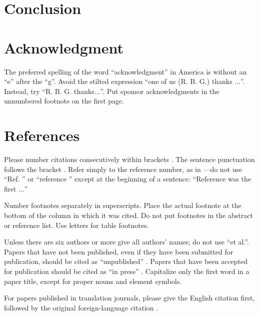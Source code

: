 \documentclass[conference]{IEEEtran}
\begin{document}
\section{Conclusion}

\section*{Acknowledgment}

The preferred spelling of the word ``acknowledgment'' in America is without 
an ``e'' after the ``g''. Avoid the stilted expression ``one of us (R. B. 
G.) thanks $\ldots$''. Instead, try ``R. B. G. thanks$\ldots$''. Put sponsor 
acknowledgments in the unnumbered footnote on the first page.

\section*{References}

Please number citations consecutively within brackets \cite{b1}. The 
sentence punctuation follows the bracket \cite{b2}. Refer simply to the reference 
number, as in \cite{b3}---do not use ``Ref. \cite{b3}'' or ``reference \cite{b3}'' except at 
the beginning of a sentence: ``Reference \cite{b3} was the first $\ldots$''

Number footnotes separately in superscripts. Place the actual footnote at 
the bottom of the column in which it was cited. Do not put footnotes in the 
abstract or reference list. Use letters for table footnotes.

Unless there are six authors or more give all authors' names; do not use 
``et al.''. Papers that have not been published, even if they have been 
submitted for publication, should be cited as ``unpublished'' \cite{b4}. Papers 
that have been accepted for publication should be cited as ``in press'' \cite{b5}. 
Capitalize only the first word in a paper title, except for proper nouns and 
element symbols.

For papers published in translation journals, please give the English 
citation first, followed by the original foreign-language citation \cite{b6}.
\end{document}
